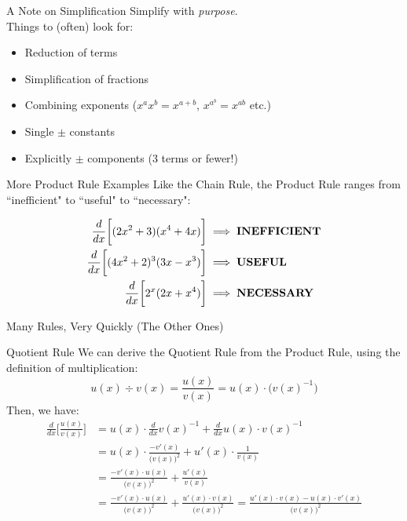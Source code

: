 \documentclass[10pt]{beamer}
\begin{document}
\begin{frame}{A Note on Simplification}
    Simplify with \textit{purpose}. \\
\vspace{.5cm}
    Things to (often) look for:
    \begin{itemize}
        \item Reduction of terms
        \item Simplification of fractions
        \item Combining exponents ($x^a x^b = x^{a+b}$, $x^{a^b} = x^{ab}$ etc.)
        \item Single $\pm$ constants
        \item Explicitly $\pm$ components (3 terms or fewer!)
        \end{itemize}
\end{frame}

\begin{frame}{More Product Rule Examples}
    Like the Chain Rule, the Product Rule ranges from ``inefficient" to ``useful" to ``necessary":

    \begin{align*}
    \frac{d}{dx} \bigg[(2x^2 + 3)(x^4 + 4x)\bigg] &\implies \text{\textbf{INEFFICIENT}} \\
    \frac{d}{dx} \bigg[ (4x^2+2)^3 (3x-x^3)\bigg] &\implies \text{\textbf{USEFUL}}\\
    \frac{d}{dx} \bigg[ 2^x(2x+x^4)\bigg] &\implies \text{\textbf{NECESSARY}}
    \end{align*}
    
\end{frame}

\begin{frame}
\thispagestyle{empty}
\vspace{1cm}
\begin{center}
\begin{Huge}
    Many Rules, Very Quickly (The Other Ones)
\end{Huge}
\end{center}
\end{frame}

\begin{frame}{Quotient Rule}
    We can derive the Quotient Rule from the Product Rule, using the definition of multiplication:
    \[u(x) \div v(x) = \frac{u(x)}{v(x)} = u(x) \cdot \Big(v(x)^{-1}\Big)\] \pause
    Then, we have:
    \begin{align*}
    \frac{d}{dx} \bigg[\frac{u(x)}{v(x)} \bigg]&= u(x) \cdot \frac{d}{dx} v(x)^{-1} + \frac{d}{dx} u(x) \cdot v(x)^{-1}\\
    &= u(x) \cdot \frac{-v'(x)}{\Big(v(x)\Big)^2} + u'(x) \cdot \frac{1}{v(x)} \\
    &= \frac{-v'(x)\cdot u(x)}{\Big(v(x)\Big)^2} + \frac{u'(x)}{v(x)} \\
    &= \frac{-v'(x)\cdot u(x)}{\Big(v(x)\Big)^2} + \frac{u'(x) \cdot v(x)}{\Big(v(x)\Big)^2 } = \frac{u'(x) \cdot v(x) - u(x) \cdot v'(x)}{\Big(v(x)\Big)^2}
    \end{align*}
\end{frame}
\end{document}
